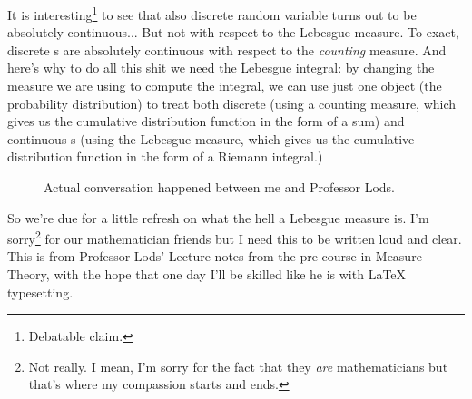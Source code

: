 \documentclass{report}
\begin{document}
It is interesting\footnote{Debatable claim.} to see that also discrete random variable turns out to be absolutely continuous... But not with respect to the Lebesgue measure. To exact, discrete \rv s are absolutely continuous with respect to the \textit{counting} measure. And here's why to do all this shit we need the Lebesgue integral: by changing the measure we are using to compute the integral, we can use just one object (the probability distribution) to treat both discrete (using a counting measure, which gives us the cumulative distribution function in the form of a sum) and continuous \rv s (using the Lebesgue measure, which gives us the cumulative distribution function in the form of a Riemann integral.)

\vspace{0.5cm}
\begin{figure}[H]
\hspace{1.5cm}
\begin{flushright}
	\hspace*{2.5cm}
\end{flushright}
\hspace{2cm}
\caption{Actual conversation happened between me and Professor Lods.}
\end{figure}
So we're due for a little refresh on what the hell a Lebesgue measure is. I'm sorry\footnote{Not really. I mean, I'm sorry for the fact that they \textit{are} mathematicians but that's where my compassion starts and ends.} for our mathematician friends but I need this to be written loud and clear. This is from Professor Lods' Lecture notes from the pre-course in Measure Theory, with the hope that one day I'll be skilled like he is with \LaTeX{} typesetting.
\end{document}
